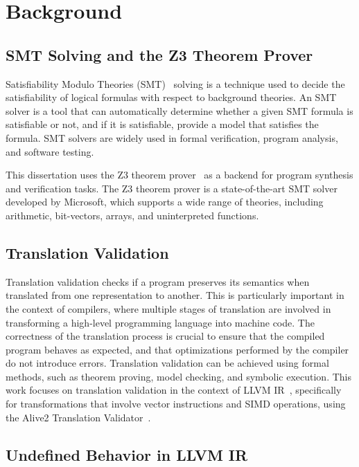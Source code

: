 \chapter{Background}
\label{chap:background}

\section {SMT Solving and the Z3 Theorem Prover}

Satisfiability Modulo Theories (SMT)~\cite{barrett2018satisfiability}
solving is a technique used to decide the satisfiability of logical
formulas with respect to background theories.
%
An SMT solver is a tool that can automatically determine whether a
given SMT formula is satisfiable or not, and if it is satisfiable,
provide a model that satisfies the formula.
%
SMT solvers are widely used in formal verification, program analysis,
and software testing.

This dissertation uses the Z3 theorem prover~\cite{z3} as a backend
for program synthesis and verification tasks.
%
The Z3 theorem prover is a state-of-the-art SMT solver developed by
Microsoft, which supports a wide range of theories, including
arithmetic, bit-vectors, arrays, and uninterpreted functions.

\section {Translation Validation}

Translation validation checks if a program preserves its semantics
when translated from one representation to another.
%
This is particularly important in the context of compilers,
where multiple stages of translation are involved in transforming a
high-level programming language into machine code.
%
The correctness of the translation process is crucial to ensure that
the compiled program behaves as expected, and that optimizations
performed by the compiler do not introduce errors.
%
Translation validation can be achieved using formal methods, such as
theorem proving, model checking, and symbolic execution.
%
This work focuses on translation validation in the context of LLVM
IR~\cite{llvm}, specifically for transformations that involve
vector instructions and SIMD operations, using the
Alive2 Translation Validator~\cite{alive2}.

\section {Undefined Behavior in LLVM IR}



